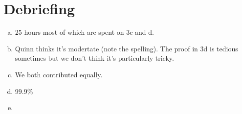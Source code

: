 \section{Debriefing}
\begin{enumerate}[(a)]
\item 25 hours most of which are spent on 3c and d.
\item Quinn thinks it's modertate (note the spelling). The proof in 3d is tedious sometimes but we don't think it's particularly tricky.
\item We both contributed equally.
\item 99.9\%
\item
\end{enumerate}
